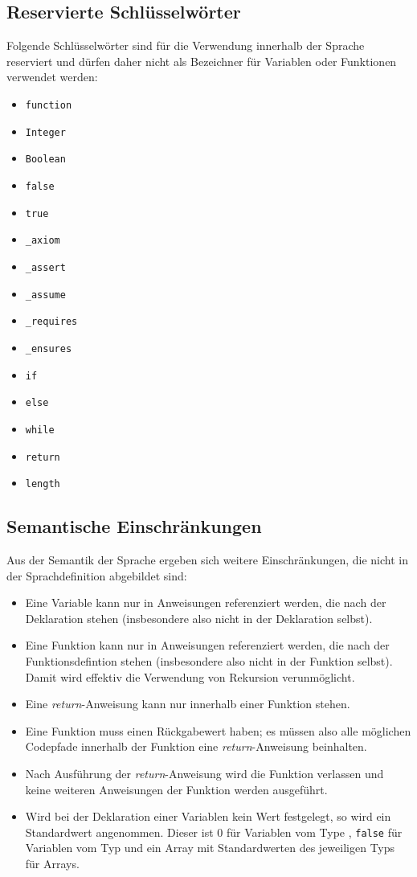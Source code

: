 \subsection{Reservierte Schlüsselwörter}

Folgende Schlüsselwörter sind für die Verwendung innerhalb der Sprache reserviert und dürfen daher nicht als Bezeichner für Variablen oder Funktionen verwendet werden:

\begin{itemize}
	\item \texttt{function}
	\item \texttt{Integer}
	\item \texttt{Boolean}
	\item \texttt{false}
	\item \texttt{true}	
	\item \texttt{\_axiom}
	\item \texttt{\_assert}
	\item \texttt{\_assume}
	\item \texttt{\_requires}
	\item \texttt{\_ensures}
	\item \texttt{if}
	\item \texttt{else}	
	\item \texttt{while}		
	\item \texttt{return}
	\item \texttt{length}
\end{itemize}

\subsection{Semantische Einschränkungen}
Aus der Semantik der Sprache ergeben sich weitere Einschränkungen, die nicht in der Sprachdefinition abgebildet sind:

\begin{itemize}
	\item Eine Variable kann nur in Anweisungen referenziert werden, die nach der Deklaration stehen (insbesondere also nicht in der Deklaration selbst).
	\item Eine Funktion kann nur in Anweisungen referenziert werden, die nach der Funktionsdefintion stehen (insbesondere also nicht in der Funktion selbst). Damit wird effektiv die Verwendung von Rekursion verunmöglicht.
	\item Eine \textit{return}-Anweisung kann nur innerhalb einer Funktion stehen.
	\item Eine Funktion muss einen Rückgabewert haben; es müssen also alle möglichen Codepfade innerhalb der Funktion eine \textit{return}-Anweisung beinhalten.
	\item Nach Ausführung der \textit{return}-Anweisung wird die Funktion verlassen und keine weiteren Anweisungen der Funktion werden ausgeführt.
	\item Wird bei der Deklaration einer Variablen kein Wert festgelegt, so wird ein Standardwert angenommen. Dieser ist 0 für Variablen vom Type \int{}, \texttt{false} für Variablen vom Typ \bool{} und ein Array mit Standardwerten des jeweiligen Typs für Arrays.
\end{itemize}

